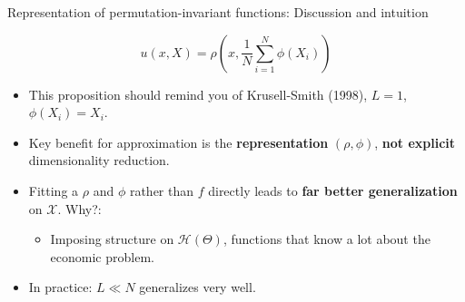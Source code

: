 \documentclass[aspectratio=169,10pt]{beamer}
\newcommand{\emphcolor}[1]{\textbf{\textcolor{emphcolorval}{#1}}}
\newcommand{\Xdom}{\mathcal{X}}
\begin{document}
	
	\begin{frame}{Representation of permutation-invariant functions: Discussion and intuition}
		
		
		$$u(x,X) = \rho\left(x,\frac{1}{N} \sum_{i=1}^N\phi(X_i)\right)$$
			\begin{itemize}
				\item This proposition should remind you of Krusell-Smith (1998), $L =1$, $\phi(X_i) = X_i$. \vspace{0.1 in}
				\item Key benefit for approximation is the \emphcolor{representation} $(\rho,\phi)$,\vspace{0.1 in} \emphcolor{not explicit} dimensionality reduction.
				\smallskip
				\item Fitting a $\rho$ and $\phi$ rather than $f$ directly leads to \emphcolor{far better generalization} on $\Xdom$. Why?:\vspace{0.1 in}
				\smallskip
				\begin{itemize}
					\item Imposing structure on $\mathcal{H}(\Theta)$, functions that know a lot about the economic problem.\vspace{0.1 in}
				\end{itemize}
				\item In practice: $L\ll N$  generalizes very well.
			\end{itemize}
	\end{frame}
		
\end{document}
